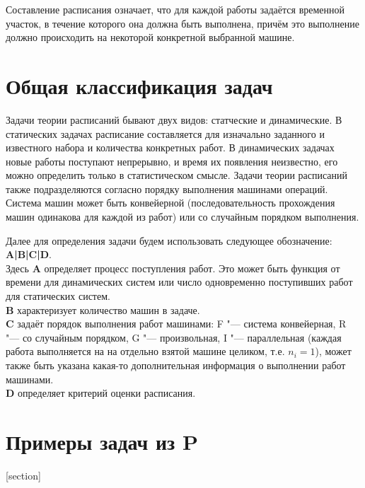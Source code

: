 \documentclass[a4paper,12pt]{article}
\theoremstyle{plain} %
\theoremstyle{definition} %
\theoremstyle{remark} %
\begin{document}
\par\bigskip
Составление расписания означает, что для каждой работы задаётся временной участок, в течение которого она должна быть выполнена, причём это выполнение должно происходить на некоторой конкретной выбранной машине.


\newpage

\section{Общая классификация задач}
Задачи теории расписаний бывают двух видов: статческие и динамические. В статических задачах расписание составляется для изначально заданного и известного набора и количества конкретных работ. В динамических задачах новые работы поступают непрерывно, и время их появления неизвестно, его можно определить только в статистическом смысле.
Задачи теории расписаний также подразделяются согласно порядку выполнения машинами операций. Система машин может быть конвейерной (последовательность прохождения машин одинакова для каждой из работ) или со случайным порядком выполнения.

\par\bigskip
Далее для определения задачи будем использовать следующее обозначение:
\textbf{A|B|C|D}. \\
Здесь \textbf{A} определяет процесс поступления работ. Это может быть функция от времени для динамических систем или число одновременно поступивших работ для статических систем. \\
\textbf{B} характеризует количество машин в задаче. \\
\textbf{C} задаёт порядок выполнения работ машинами: F "--- система конвейерная, R "--- со случайным порядком, G "--- произвольная, I "--- параллельная (каждая работа выполняется на на отдельно взятой машине целиком, т.е. $n_i = 1$), может также быть указана какая-то дополнительная информация о выполнении работ машинами. \\
\textbf{D} определяет критерий оценки расписания.

\newpage

\section{Примеры задач из P}

[section]

\newcommand{\z}[2]{ %

\addtocounter{zc}{1}
\textbf{Задача \thesection.\arabic{zc}. #1}\\ #2

}
\end{document}
